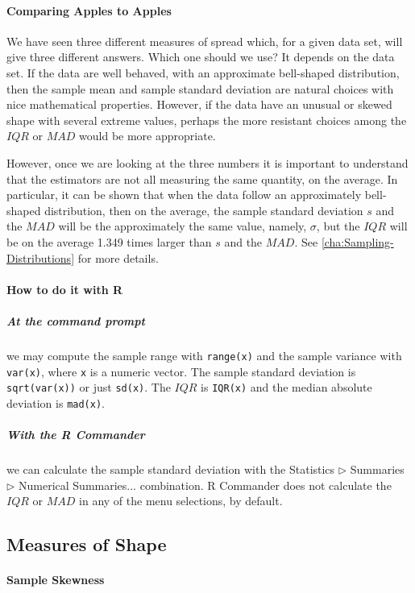 \documentclass[captions=tableheading]{scrbook}
\begin{document}
\paragraph*{Comparing Apples to Apples}

We have seen three different measures of spread which, for a given data set, will give three different answers. Which one should we use? It depends on the data set. If the data are well behaved, with an approximate bell-shaped distribution, then the sample mean and sample standard deviation are natural choices with nice mathematical properties. However, if the data have an unusual or skewed shape with several extreme values, perhaps the more resistant choices among the \(IQR\) or \(MAD\) would be more appropriate.

However, once we are looking at the three numbers it is important to understand that the estimators are not all measuring the same quantity, on the average. In particular, it can be shown that when the data follow an approximately bell-shaped distribution, then on the average, the sample standard deviation \(s\) and the \(MAD\) will be the approximately the same value, namely, \(\sigma\), but the \(IQR\) will be on the average 1.349 times larger than \(s\) and the \(MAD\). See \ref{cha:Sampling-Distributions} for more details.


\paragraph*{How to do it with \textsf{R}}

\subparagraph*{At the command prompt}
we may compute the sample range with \texttt{range(x)} and the sample variance with \texttt{var(x)}, where \texttt{x} is a numeric vector. The sample standard deviation is \texttt{sqrt(var(x))} or just \texttt{sd(x)}. The \(IQR\) is \texttt{IQR(x)} and the median absolute deviation is \texttt{mad(x)}.

\subparagraph*{With the \textsf{R} Commander}
we can calculate the sample standard deviation with the \textsf{Statistics \(\triangleright\) Summaries \(\triangleright\) Numerical Summaries}... combination. \textsf{R} Commander does not calculate the \(IQR\) or \(MAD\) in any of the menu selections, by default.
\subsection{Measures of Shape \label{sub:Measures-of-Shape}}
\label{sec-3-3-5}


\paragraph*{Sample Skewness}
\end{document}
